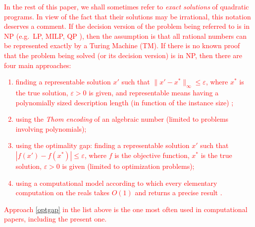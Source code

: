 \textcolor{red}{In the rest of this paper, we shall sometimes refer to {\it exact solutions} of quadratic programs. In view of the fact that their solutions may be irrational, this notation deserves a comment. If the decision version of the problem being referred to is in NP (e.g.~LP, MILP, QP \cite{vavasis90a}), then the assumption is that all rational numbers can be represented exactly by a Turing Machine (TM). 
If there is no known proof that the problem being solved (or its decision version) is in NP, then there are four main approaches:
\begin{enumerate}
\item finding a representable solution $x'$ such that $\|x'-x^\ast\|_\infty\le\varepsilon$, where $x^\ast$ is the true solution, $\varepsilon>0$ is given, and representable means having a polynomially sized description length
(in function of the instance size) \cite{hochbaum2};
\item using the {\it Thom encoding} of an algebraic number \cite[Prop.~2.28]{pollack} (limited to problems involving polynomials);
\item using the optimality gap: finding a representable solution $x'$ such that $|f(x')-f(x^\ast)|\le\varepsilon$, where $f$ is the objective function, $x^\ast$ is the true solution, $\varepsilon>0$ is given
(limited to optimization problems);\label{optgap}
\item using a computational model according to which every elementary computation on the reals takes $O(1)$ and returns a precise result \cite[p.~24]{blum}.
\end{enumerate}
Approach \ref{optgap} in the list above is the one most often used in computational papers, including the present one.}


